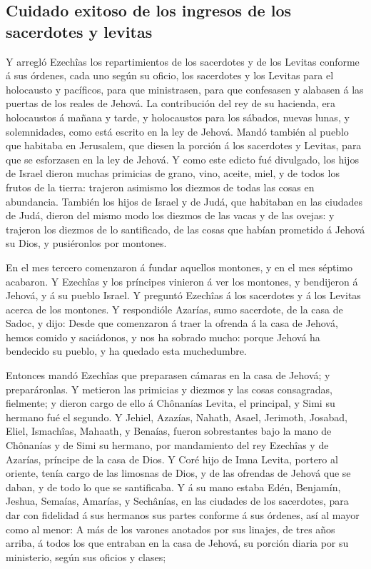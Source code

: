 \hypertarget{cuidado-exitoso-de-los-ingresos-de-los-sacerdotes-y-levitas}{%
\subsection{Cuidado exitoso de los ingresos de los sacerdotes y
levitas}\label{cuidado-exitoso-de-los-ingresos-de-los-sacerdotes-y-levitas}}

 Y arregló Ezechîas los repartimientos de los sacerdotes y
de los Levitas conforme á sus órdenes, cada uno según su oficio, los
sacerdotes y los Levitas para el holocausto y pacíficos, para que
ministrasen, para que confesasen y alabasen á las puertas de los reales
de Jehová.  La contribución del rey de su hacienda, era
holocaustos á mañana y tarde, y holocaustos para los sábados, nuevas
lunas, y solemnidades, como está escrito en la ley de Jehová.
 Mandó también al pueblo que habitaba en Jerusalem, que
diesen la porción á los sacerdotes y Levitas, para que se esforzasen en
la ley de Jehová.  Y como este edicto fué divulgado, los
hijos de Israel dieron muchas primicias de grano, vino, aceite, miel, y
de todos los frutos de la tierra: trajeron asimismo los diezmos de todas
las cosas en abundancia.  También los hijos de Israel y de
Judá, que habitaban en las ciudades de Judá, dieron del mismo modo los
diezmos de las vacas y de las ovejas: y trajeron los diezmos de lo
santificado, de las cosas que habían prometido á Jehová su Dios, y
pusiéronlos por montones.

 En el mes tercero comenzaron á fundar aquellos montones, y
en el mes séptimo acabaron.  Y Ezechîas y los príncipes
vinieron á ver los montones, y bendijeron á Jehová, y á su pueblo
Israel.  Y preguntó Ezechîas á los sacerdotes y á los
Levitas acerca de los montones.  Y respondióle Azarías,
sumo sacerdote, de la casa de Sadoc, y dijo: Desde que comenzaron á
traer la ofrenda á la casa de Jehová, hemos comido y saciádonos, y nos
ha sobrado mucho: porque Jehová ha bendecido su pueblo, y ha quedado
esta muchedumbre.

 Entonces mandó Ezechîas que preparasen cámaras en la casa
de Jehová; y preparáronlas.  Y metieron las primicias y
diezmos y las cosas consagradas, fielmente; y dieron cargo de ello á
Chônanías Levita, el principal, y Simi su hermano fué el segundo.
 Y Jehiel, Azazías, Nahath, Asael, Jerimoth, Josabad,
Eliel, Ismachîas, Mahaath, y Benaías, fueron sobrestantes bajo la mano
de Chônanías y de Simi su hermano, por mandamiento del rey Ezechîas y de
Azarías, príncipe de la casa de Dios.  Y Coré hijo de Imna
Levita, portero al oriente, tenía cargo de las limosnas de Dios, y de
las ofrendas de Jehová que se daban, y de todo lo que se santificaba.
 Y á su mano estaba Edén, Benjamín, Jeshua, Semaías,
Amarías, y Sechânías, en las ciudades de los sacerdotes, para dar con
fidelidad á sus hermanos sus partes conforme á sus órdenes, así al mayor
como al menor:  A más de los varones anotados por sus
linajes, de tres años arriba, á todos los que entraban en la casa de
Jehová, su porción diaria por su ministerio, según sus oficios y clases;

